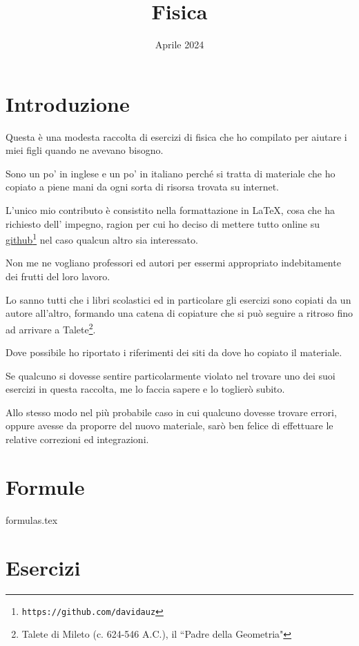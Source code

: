 \documentclass[a4paper,14pt]{extarticle}
\title{Fisica}
\author{}
\date{Aprile 2024}
\begin{document}
\maketitle
\tableofcontents
\newpage

\section{Introduzione}

Questa è una modesta raccolta di esercizi di fisica che ho compilato per aiutare i
miei figli quando ne avevano bisogno.

Sono un po' in inglese e un po' in italiano perché
si tratta di materiale che ho copiato a piene mani da ogni sorta di risorsa trovata su internet.

L'unico mio contributo è consistito nella formattazione in  \LaTeX, cosa che ha richiesto 
dell' impegno, ragion per cui ho deciso di mettere tutto online su \href{https://github.com/davidauz}{github}\footnote{\texttt{https://github.com/davidauz}}
nel caso qualcun altro sia interessato.

Non me ne vogliano professori ed autori per essermi appropriato indebitamente dei frutti del loro lavoro.

Lo sanno tutti che i libri scolastici ed in particolare gli esercizi sono copiati da un autore all'altro,
formando una catena di copiature che si può seguire a ritroso fino ad arrivare a 
Talete\footnote{Talete di Mileto (c. 624-546 A.C.), il ``Padre della Geometria"}.

Dove possibile ho riportato i riferimenti dei siti da dove ho copiato il materiale.

Se qualcuno si dovesse sentire particolarmente violato nel trovare uno dei suoi esercizi in 
questa raccolta, me lo faccia sapere e lo toglierò subito.

Allo stesso modo nel più probabile caso in cui qualcuno dovesse trovare errori, oppure avesse da proporre del 
nuovo materiale, sarò ben felice di effettuare le relative correzioni ed integrazioni.



\section{Formule}

 {formulas.tex}

\section{Esercizi}













\end{document}
